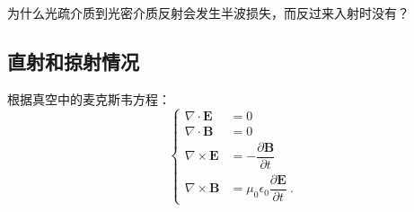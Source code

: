 
\begin{issues}
\issueDraft
\end{issues}

为什么光疏介质到光密介质反射会发生半波损失，而反过来入射时没有？

\subsection{直射和掠射情况}
根据真空中的麦克斯韦方程：
\begin{equation}
\begin{cases}
\nabla\cdot \boldsymbol{E}&=0\\
\nabla\cdot \boldsymbol{B}&=0\\
\nabla\times  \boldsymbol{E}&=-\dfrac{\partial \boldsymbol{B}}{\partial t} \\
\nabla\times  \boldsymbol{B}&=\mu_0\epsilon_0\dfrac{\partial \boldsymbol{E}}{\partial t}~.
\end{cases}
\end{equation}